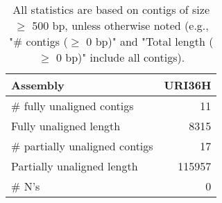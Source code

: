 \documentclass[12pt,a4paper]{article}
\begin{document}
\begin{table}[ht]
\begin{center}
\caption{All statistics are based on contigs of size $\geq$ 500 bp, unless otherwise noted (e.g., "\# contigs ($\geq$ 0 bp)" and "Total length ($\geq$ 0 bp)" include all contigs).}
\begin{tabular}{|l*{1}{|r}|}
\hline
Assembly & URI36H \\ \hline
\# fully unaligned contigs & 11 \\ \hline
Fully unaligned length & 8315 \\ \hline
\# partially unaligned contigs & 17 \\ \hline
Partially unaligned length & 115957 \\ \hline
\# N's & 0 \\ \hline
\end{tabular}
\end{center}
\end{table}
\end{document}
